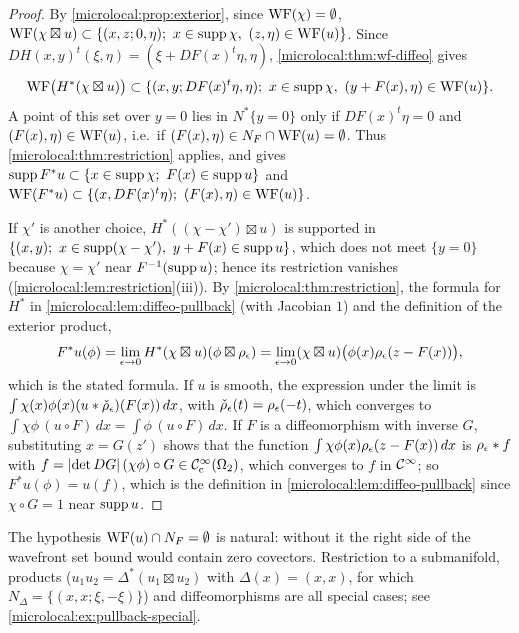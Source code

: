 \begin{proof}
  By \cref{microlocal:prop:exterior}, since $\operatorname{WF}(\chi)=\emptyset$,
  $\WF(\chi\boxtimes u)\subset\{(x,z;0,\eta);\ x\in\supp\chi,\
  (z,\eta)\in\WF(u)\}$. Since $DH(x,y)^t(\xi,\eta)=(\xi+DF(x)^t\eta,\eta)$,
  \cref{microlocal:thm:wf-diffeo} gives
  \begin{equation*}
    \operatorname{WF}\bigl(H^*(\chi\boxtimes u)\bigr)\subset\{(x,y;DF(x)^t\eta,\eta);\
    x\in\operatorname{supp}\chi,\ (y+F(x),\eta)\in\operatorname{WF}(u)\}.
  \end{equation*}
  A point of this set over $y=0$ lies in $N^*\{y=0\}$ only if
  $DF(x)^t\eta=0$ and $(F(x),\eta)\in\operatorname{WF}(u)$, i.e.\ if $(F(x),\eta)\in
  N_F\cap\operatorname{WF}(u)=\emptyset$. Thus \cref{microlocal:thm:restriction} applies,
  and gives $\operatorname{supp} F^*u\subset\{x\in\operatorname{supp}\chi;\ F(x)\in\operatorname{supp} u\}$ and
  $\WF(F^*u)\subset\{(x,DF(x)^t\eta);\ (F(x),\eta)\in\WF(u)\}$.

  If $\chi'$ is another choice, $H^*((\chi-\chi')\boxtimes u)$ is supported in
  $\{(x,y);\ x\in\supp(\chi-\chi'),\ y+F(x)\in\supp u\}$, which does not meet
  $\{y=0\}$ because $\chi=\chi'$ near $F^{-1}(\operatorname{supp} u)$; hence its restriction
  vanishes (\cref{microlocal:lem:restriction}(iii)). By
  \cref{microlocal:thm:restriction}, the formula for $H^*$ in
  \cref{microlocal:lem:diffeo-pullback} (with Jacobian $1$) and the definition
  of the exterior product,
  \begin{equation*}
    F^*u(\phi)=\lim_{\epsilon\to0}H^*(\chi\boxtimes u)(\phi\boxtimes\rho_\epsilon)
    =\lim_{\epsilon\to0}(\chi\boxtimes u)\bigl(\phi(x)\rho_\epsilon(z-F(x))\bigr),
  \end{equation*}
  which is the stated formula. If $u$ is smooth, the expression under the
  limit is $\int\chi(x)\phi(x)(u*\check\rho_\epsilon)(F(x))\,dx$, with
  $\check\rho_\epsilon(t)=\rho_\epsilon(-t)$, which converges to
  $\int\chi\phi\,(u\circ F)\,dx=\int\phi\,(u\circ F)\,dx$. If $F$ is a diffeomorphism with
  inverse $G$, substituting $x=G(z')$ shows that the function
  $\int\chi\phi(x)\rho_\epsilon(z-F(x))\,dx$ is
  $\rho_\epsilon*f$ with $f=\lvert \det DG\rvert\,(\chi\phi)\circ G\in\mathcal{C}^\infty_{\mathrm{c}}(\Omega_2)$, which
  converges to $f$ in $\mathcal{C}^\infty$; so $F^*u(\phi)=u(f)$, which is the definition in
  \cref{microlocal:lem:diffeo-pullback} since $\chi\circ G=1$ near $\operatorname{supp}
  u$.
\end{proof}

The hypothesis $\operatorname{WF}(u)\cap N_F=\emptyset$ is natural: without it the right
side of the wavefront set bound would contain zero covectors.
Restriction to a submanifold, products ($u_1u_2=\Delta^*(u_1\boxtimes u_2)$ with
$\Delta(x)=(x,x)$, for which $N_\Delta=\{(x,x;\xi,-\xi)\}$) and
diffeomorphisms are all special cases; see
\cref{microlocal:ex:pullback-special}.

